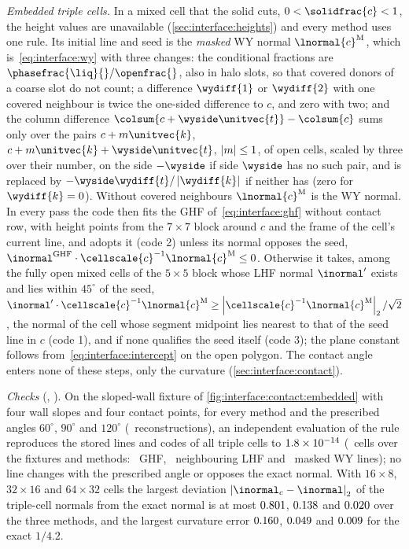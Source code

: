 \emph{Embedded triple cells.} In a mixed cell that the solid cuts,
$0<\solidfrac{c}<1$, the height values are unavailable
(\cref{sec:interface:heights}) and every method uses one rule. Its initial
line and seed is the \emph{masked} WY normal $\lnormal{c}^{\mathrm{M}}$,
which is~\cref{eq:interface:wy} with three changes: the conditional fractions
are $\phasefrac{\liq}{}/\openfrac{}$, also in halo slots, so that covered
donors of a coarse slot do not count; a difference $\wydiff{1}$ or
$\wydiff{2}$ with one covered neighbour is twice the one-sided difference to $c$, and zero
with two; and the column difference $\colsum{c+\wyside\unitvec{t}}-\colsum{c}$
sums only over the pairs $c+m\unitvec{k}$, $c+m\unitvec{k}+\wyside\unitvec{t}$,
$\left\lvert m \right\rvert\le1$, of open cells, scaled by three over their number, on the side
$-\wyside$ if side $\wyside$ has no such pair, and is replaced by
$-\wyside\wydiff{t}/\abs{\wydiff{k}}$ if neither has (zero for
$\wydiff{k}=0$). Without covered neighbours $\lnormal{c}^{\mathrm{M}}$ is the
WY normal. In every pass the code then fits the GHF
of~\cref{eq:interface:ghf} without contact row, with height points from the
$7\times7$ block around $c$ and the frame of the cell's current line, and
adopts it (code 2) unless its normal opposes the seed,
$\inormal^{\mathrm{GHF}}\cdot\cellscale{c}^{-1}\lnormal{c}^{\mathrm{M}}\le0$.
Otherwise it takes, among the fully open mixed cells of the $5\times5$ block
whose LHF normal $\inormal'$ exists and lies within $45^\circ$ of the seed,
$\inormal'\cdot\cellscale{c}^{-1}\lnormal{c}^{\mathrm{M}}\ge\abs{\cellscale{c}^{-1}\lnormal{c}^{\mathrm{M}}}_2/\sqrt2$,
the normal of the cell whose segment midpoint lies nearest to that of the
seed line in $c$ (code 1), and if none qualifies the seed itself (code 3); the
plane constant follows from~\cref{eq:interface:intercept} on the open
polygon. The contact angle enters none of these steps, only the curvature
(\cref{sec:interface:contact}).

\emph{Checks} (, ). On the
sloped-wall fixture of \cref{fig:interface:contact:embedded} with four wall
slopes and four contact points, for every method and the prescribed angles
$60^\circ$, $90^\circ$ and $120^\circ$ (\chkTripleRuleConfigs\
reconstructions), an independent evaluation of the rule reproduces the stored
lines and codes of all triple cells to $1.8\times10^{-14}$ (\chkTripleRuleCells\
cells over the fixtures and methods: \chkTripleGhf\ GHF, \chkTripleLhf\
neighbouring LHF and \chkTripleWy\ masked WY lines); no line changes with the
prescribed angle or opposes the exact normal. With $16\times8$, $32\times16$
and $64\times32$ cells the largest deviation $\abs{\inormal_c-\inormal}_2$ of
the triple-cell normals from the exact normal is at most $0.801$,
$0.138$ and $0.020$ over the three methods, and the
largest curvature error $0.160$, $0.049$ and
$0.009$ for the exact $1/4.2$.

